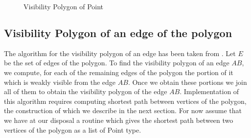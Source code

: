 \begin{figure}[h]
\begin{center}
\caption{\label{fig:Visibility Polygon of Point}Visibility Polygon of Point}
\end{center}
\end{figure}





\newcommand{\jttstylea}{\color[rgb]{1.00,1.00,1.00}} %
\newcommand{\jttstyleb}{\color[rgb]{.501,.501,.501}} %
\newcommand{\jttstylec}{\color[rgb]{.247,.498,.372}} %
\newcommand{\jttstyled}{\color[rgb]{.247,.498,.372}} %
\newcommand{\jttstylee}{\color[rgb]{.498,.000,.333}} %
\newcommand{\jttstylef}{\color[rgb]{.164,.000,1.00}} %
\newcommand{\jttstyleg}{\color[rgb]{.600,.000,.000}} %
\newcommand{\jttstyleh}{\color[rgb]{.600,.000,.000}} %
\newcommand{\jttstylei}{\color[rgb]{.000,.000,.000}} %
\newcommand{\jttstylej}{\color[rgb]{.498,.000,.333}} %
\newcommand{\jttstylek}{\color[rgb]{.000,.000,.000}} %
\newcommand{\jttstylel}{\color[rgb]{.498,.623,.749}} %
\newcommand{\jttstylem}{\color[rgb]{.498,.498,.623}} %
\newcommand{\jttstylen}{\color[rgb]{.247,.247,.749}} %
\newcommand{\jttstyleo}{\color[rgb]{.247,.372,.749}} %
\newcommand{\jttstylep}{\color[rgb]{1.00,.380,.000}} %
\newcommand{\jttstyleq}{\color[rgb]{.392,.392,.392}} %




\subsection{Visibility Polygon of an edge of the polygon}
The algorithm for the visibility polygon of an edge has been taken from \cite{key3}.
Let $E$ be the set of edges of the polygon. To find the visibility polygon of an edge $AB$, we compute, for each of 
 the remaining edges of the polygon the portion of it which is weakly visible from the edge $AB$. Once we obtain these portions we join
 all of them to obtain the visibility polygon of the edge $AB$.
  Implementation of this algorithm requires computing shortest path between vertices of the polygon, the construction of which we 
describe in the next section. For now assume that we have at our disposal a routine which gives the shortest path between two vertices 
of the polygon as a list of Point type.

